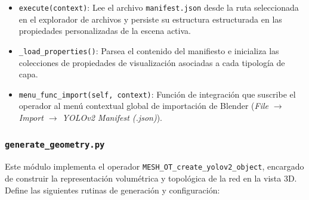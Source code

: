 \begin{itemize}
    \item \texttt{execute(context)}: Lee el archivo \texttt{manifest.json} desde la ruta seleccionada en el explorador de archivos y persiste su 
    estructura estructurada en las propiedades personalizadas de la escena activa.
    \item \texttt{\_load\_properties()}: Parsea el contenido del manifiesto e inicializa las colecciones de propiedades de visualización asociadas 
    a cada tipología de capa.
    \item \texttt{menu\_func\_import(self, context)}: Función de integración que suscribe el operador al menú contextual global de importación de 
    Blender (\textit{File $\rightarrow$ Import $\rightarrow$ YOLOv2 Manifest (.json)}).
\end{itemize}

\subsubsection{\texttt{generate\_geometry.py}}
Este módulo implementa el operador \texttt{MESH\_OT\_create\_yolov2\_object}, encargado de construir la representación volumétrica y topológica 
de la red en la vista 3D. Define las siguientes rutinas de generación y configuración:

